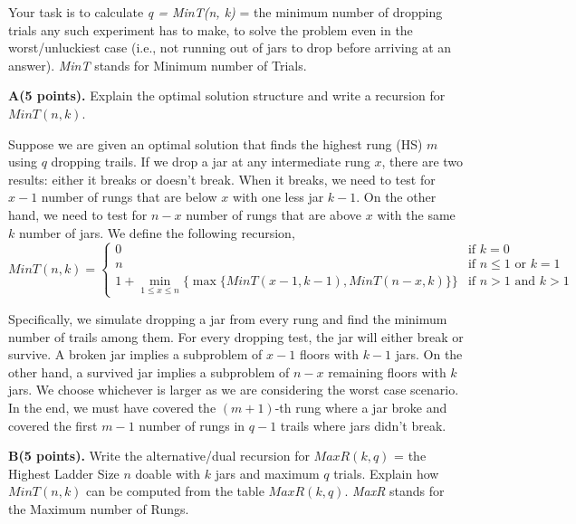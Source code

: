 \documentclass[11pt]{article}
\theoremstyle{definition}
\theoremstyle{theorem}
\newcommand{\solution}{\medskip\noindent{\color{DarkBlue}\textbf{Solution:}}}
\begin{document}
Your task is to calculate \textit{q = MinT(n, k)} = the minimum number of dropping trials any such experiment has to make, to solve the problem even in the worst/unluckiest case (i.e., not running out of jars to drop before arriving at an answer). \textit{MinT} stands for Minimum number of Trials.

\noindent\textbf{A(5 points).} Explain the optimal solution structure and write a recursion for $\textit{MinT}(n, k)$. 

\solution

Suppose we are given an optimal solution that finds the highest rung (HS) $m$ using $q$ dropping trails. If we drop a jar at any intermediate rung $x$, there are two results: either it breaks or doesn't break. When it breaks, we need to test for $x-1$ number of rungs that are below $x$ with one less jar $k - 1$. On the other hand, we need to test for $n - x$ number of rungs that are above $x$ with the same $k$ number of jars. 
We define the following recursion,
\[
\textit{MinT}(n, k) = 
\begin{cases}
	0 &\mbox{if } k = 0 \\
	n &\mbox{if } n  \le 1 \text{ or } k = 1 \\
	1 + \min_{1 \le x \le n} \Big\{ \max \big\{ \textit{MinT}(x - 1, k - 1),  \textit{MinT}(n - x, k) \big\} \Big\} 	&\mbox{if } n > 1 \text{ and } k > 1 
\end{cases}
\]

Specifically, we simulate dropping a jar from every rung and find the minimum number of trails among them. For every dropping test, the jar will either break or survive. A broken jar implies a subproblem of $x-1$ floors with $k-1$ jars. On the other hand, a survived jar implies a subproblem of $n-x$ remaining floors with $k$ jars. We choose whichever is larger as we are considering the worst case scenario. In the end, we must have covered the $(m+1)$-th rung where a jar broke and covered the first $m-1$ number of rungs in $q-1$ trails where jars didn't break. 


\newpage
\noindent\textbf{B(5 points).} Write  the  alternative/dual  recursion for $\textit{MaxR}(k, q)$  =  the Highest Ladder Size $n$ doable with $k$ jars and maximum $q$ trials.  Explain how $\textit{MinT}(n, k)$ can be computed from the table $\textit{MaxR}(k, q)$. \textit{MaxR} stands for the Maximum number of Rungs.

\solution
\end{document}
